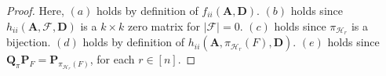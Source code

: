 \documentclass[journal,draftcls,onecolumn]{IEEEtran}
\theoremstyle{mystyle}
\newcommand{\bfD}{\mathbf{D}}
\newcommand{\bfQ}{\mathbf{Q}}
\newcommand{\bfA}{\mathbf{A}}
\newcommand{\bfP}{\mathbf{P}}
\newcommand{\cF}{\mathcal{F}}
\begin{document}
\begin{proof}

Here, $(a)$ holds by definition of $f_{ii}(\bfA, \bfD)$. $(b)$ holds since $h_{ii}(\bfA, \cF, \bfD)$ is a $k \times k$ zero matrix for $|\cF| = 0$. $(c)$ holds since $\pi_{\mathcal{H}_r}$ is a bijection. $(d)$ holds by definition of $h_{ii}(\mathbf{A}, \pi_{\mathcal{H}_r}(F), \mathbf{D})$. $(e)$ holds since  $\bfQ_{\pi} \bfP_{F} = \bfP_{\pi_{\mathcal{H}_r}(F)}$, for each $r \in [n]$. 


\end{proof}
\end{document}
